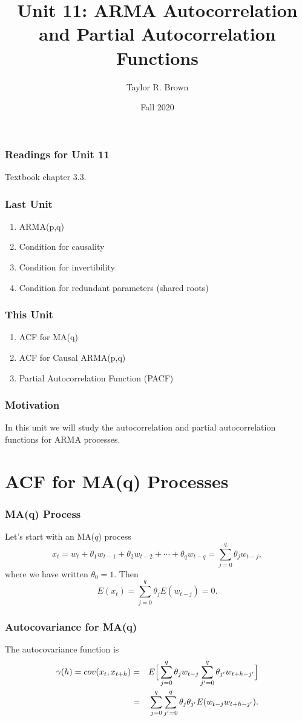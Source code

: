\documentclass[%
xcolor=pdftex]{beamer}
\title{Unit 11: ARMA Autocorrelation and Partial Autocorrelation Functions}
\author[STAT 5170: Applied Time Series, Unit 11]{Taylor R. Brown}
\institute{Department of Statistics, University of Virginia}
\date{Fall 2020}
\begin{document}
\frame{\titlepage}


\begin{frame}
\frametitle{Readings for Unit 11}

Textbook chapter 3.3.

\end{frame}


\begin{frame}
\frametitle{Last Unit}
\begin{enumerate}
\item ARMA(p,q)
\item Condition for causality
\item Condition for invertibility
\item Condition for redundant parameters (shared roots)
\end{enumerate}
\end{frame}


\begin{frame}
\frametitle{This Unit}
\begin{enumerate}
\item ACF for MA(q)
\item ACF for Causal ARMA(p,q)
\item Partial Autocorrelation Function (PACF)
\end{enumerate}
\end{frame}


\begin{frame}
\frametitle{Motivation}

In this unit we will study the autocorrelation and partial autocorrelation
 functions for ARMA processes.

\end{frame}

\section{ACF for MA(q) Processes}

\begin{frame}
\frametitle{MA(q) Process}

 Let's start with an MA($q$) process
 $$
 x_t = w_t + \theta_1 w_{t-1} + \theta_2 w_{t-2} + \cdots + \theta_q w_{t-q} = \sum^q_{j=0} \theta_j w_{t-j},
 $$
where we have written $\theta_0=1$. Then
$$
E(x_t) =\sum^q_{j=0} \theta_j E(w_{t-j})=0.
$$

\end{frame}

\begin{frame}
\frametitle{Autocovariance for MA(q)}

The autocovariance function is
\begin{eqnarray*}
\gamma(h) = cov(x_t,x_{t+h}) &=& E \Big [ \sum^q_{j=0} \theta_j w_{t-j} \sum^q_{j'=0} \theta_{j'} w_{t+h-j'} \Big ] \cr
&=& \sum^q_{j=0} \sum^q_{j'=0} \theta_j \theta_{j'} E(w_{t-j} w_{t+h-j'}).
\end{eqnarray*}

\end{frame}
\end{document}
